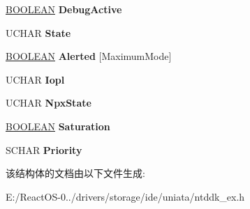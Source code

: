 \begin{DoxyCompactItemize}
\item 
\mbox{\label{struct___k_t_h_r_e_a_d___h_d_r_a4472c6f761dd39f551538d68a9d7563a}} 
\hyperlink{_processor_bind_8h_a112e3146cb38b6ee95e64d85842e380a}{B\+O\+O\+L\+E\+AN} {\bfseries Debug\+Active}
\item 
\mbox{\label{struct___k_t_h_r_e_a_d___h_d_r_ad788894e273a6fd4e3e2ce7466b329cb}} 
U\+C\+H\+AR {\bfseries State}
\item 
\mbox{\label{struct___k_t_h_r_e_a_d___h_d_r_a4cbbc5ba2d1339d2685c2a4d6f1e2953}} 
\hyperlink{_processor_bind_8h_a112e3146cb38b6ee95e64d85842e380a}{B\+O\+O\+L\+E\+AN} {\bfseries Alerted} \mbox{[}Maximum\+Mode\mbox{]}
\item 
\mbox{\label{struct___k_t_h_r_e_a_d___h_d_r_a4d15f9c2ce2876f68f411240e329eee4}} 
U\+C\+H\+AR {\bfseries Iopl}
\item 
\mbox{\label{struct___k_t_h_r_e_a_d___h_d_r_aeb6add18fb88379ffaf06da64e3ef359}} 
U\+C\+H\+AR {\bfseries Npx\+State}
\item 
\mbox{\label{struct___k_t_h_r_e_a_d___h_d_r_a8f05ea3b32b46d863dc6614cc2fc0d8c}} 
\hyperlink{_processor_bind_8h_a112e3146cb38b6ee95e64d85842e380a}{B\+O\+O\+L\+E\+AN} {\bfseries Saturation}
\item 
\mbox{\label{struct___k_t_h_r_e_a_d___h_d_r_abc3b6ea790ffbe30850647ecc259b02b}} 
S\+C\+H\+AR {\bfseries Priority}
\end{DoxyCompactItemize}


该结构体的文档由以下文件生成\+:\begin{DoxyCompactItemize}
\item 
E\+:/\+React\+O\+S-\/0../drivers/storage/ide/uniata/ntddk\+\_\+ex.\+h\end{DoxyCompactItemize}

